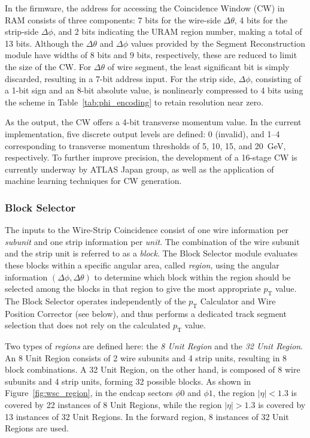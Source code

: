 In the firmware, the address for accessing the Coincidence Window (CW) in RAM consists of three components: 7 bits for the wire-side \(\Delta\theta\), 4 bits for the strip-side \(\Delta\phi\), and 2 bits indicating the URAM region number, making a total of 13 bits. Although the \(\Delta\theta\) and \(\Delta\phi\) values provided by the Segment Reconstruction module have widths of 8 bits and 9 bits, respectively, these are reduced to limit the size of the CW. For \(\Delta\theta\) of wire segment, the least significant bit is simply discarded, resulting in a 7-bit address input. For the strip side, \(\Delta\phi\), consisting of a 1-bit sign and an 8-bit absolute value, is nonlinearly compressed to 4 bits using the scheme in Table~\ref{tab:phi_encoding} to retain resolution near zero.



As the output, the CW offers a 4-bit transverse momentum value. In the current implementation, five discrete output levels are defined: 0 (invalid), and 1–4 corresponding to transverse momentum thresholds of 5, 10, 15, and 20~GeV, respectively. To further improve precision, the development of a 16-stage CW is currently underway by ATLAS Japan group, as well as the application of machine learning techniques for CW generation.

\subsubsection{Block Selector}

The inputs to the Wire-Strip Coincidence consist of one wire information per \textit{subunit} and one strip information per \textit{unit}. The combination of the wire subunit and the strip unit is referred to as a \textit{block}. The Block Selector module evaluates these blocks within a specific angular area, called \textit{region}, using the angular information \((\Delta\phi, \Delta\theta)\) to determine which block within the region should be selected among the blocks in that region to give the most appropriate $p_{\mathrm{T}}$ value. The Block Selector operates independently of the $p_{\mathrm{T}}$ Calculator and Wire Position Corrector (see below), and thus performs a dedicated track segment selection that does not rely on the calculated \(p_{\mathrm{T}}\) value.

Two types of \textit{regions} are defined here: the \textit{8 Unit Region} and the \textit{32 Unit Region}. An 8 Unit Region consists of 2 wire subunits and 4 strip units, resulting in 8 block combinations. A 32 Unit Region, on the other hand, is composed of 8 wire subunits and 4 strip units, forming 32 possible blocks. As shown in Figure~\ref{fig:wsc_region}, in the endcap sectors \(\phi0\) and \(\phi1\), the region \(|\eta| < 1.3\) is covered by 22 instances of 8 Unit Regions, while the region \(|\eta| > 1.3\) is covered by 13 instances of 32 Unit Regions. In the forward region, 8 instances of 32 Unit Regions are used.

